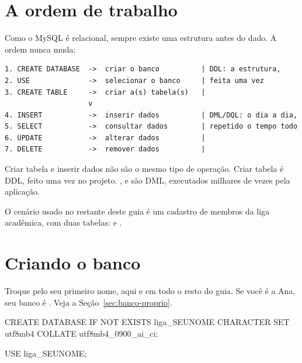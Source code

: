 \newpage

\section{A ordem de trabalho}

Como o MySQL é relacional, sempre existe uma estrutura antes do dado. A ordem
nunca muda:

\begin{lstlisting}[style=base,caption={Do banco vazio ao dado consultado},label={lst:ordem}]
1. CREATE DATABASE  ->  criar o banco          | DDL: a estrutura,
2. USE              ->  selecionar o banco     | feita uma vez
3. CREATE TABLE     ->  criar a(s) tabela(s)   |
                    v
4. INSERT           ->  inserir dados          | DML/DQL: o dia a dia,
5. SELECT           ->  consultar dados        | repetido o tempo todo
6. UPDATE           ->  alterar dados          |
7. DELETE           ->  remover dados          |
\end{lstlisting}

\begin{aviso}
Criar tabela e inserir dados não são o mesmo tipo de operação. Criar tabela é
DDL, feito uma vez no projeto. ,  e
 são DML, executados milhares de vezes pela aplicação.
\end{aviso}

O cenário usado no restante deste guia é um cadastro de membros da liga
acadêmica, com duas tabelas:  e .

\section{Criando o banco}
\label{sec:create-database}

\begin{aviso}
Troque  pelo seu primeiro nome, aqui e em todo o resto do
guia. Se você é a Ana, seu banco é . Veja a
Seção~\ref{sec:banco-proprio}.
\end{aviso}

\begin{sqlcode}
CREATE DATABASE IF NOT EXISTS liga_SEUNOME
  CHARACTER SET utf8mb4
  COLLATE utf8mb4_0900_ai_ci;

USE liga_SEUNOME;
\end{sqlcode}

